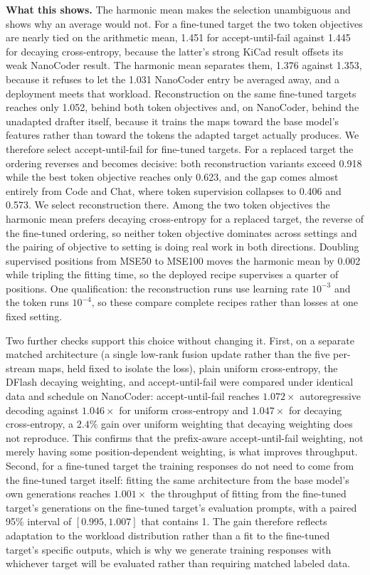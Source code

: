 \textbf{What this shows.} The harmonic mean makes the selection unambiguous and shows why an average would not. For a fine-tuned target the two token objectives are nearly tied on the arithmetic mean, 1.451 for accept-until-fail against 1.445 for decaying cross-entropy, because the latter's strong KiCad result offsets its weak NanoCoder result. The harmonic mean separates them, 1.376 against 1.353, because it refuses to let the 1.031 NanoCoder entry be averaged away, and a deployment meets that workload. Reconstruction on the same fine-tuned targets reaches only 1.052, behind both token objectives and, on NanoCoder, behind the unadapted drafter itself, because it trains the maps toward the base model's features rather than toward the tokens the adapted target actually produces. We therefore select accept-until-fail for fine-tuned targets. For a replaced target the ordering reverses and becomes decisive: both reconstruction variants exceed 0.918 while the best token objective reaches only 0.623, and the gap comes almost entirely from Code and Chat, where token supervision collapses to 0.406 and 0.573. We select reconstruction there. Among the two token objectives the harmonic mean prefers decaying cross-entropy for a replaced target, the reverse of the fine-tuned ordering, so neither token objective dominates across settings and the pairing of objective to setting is doing real work in both directions. Doubling supervised positions from MSE50 to MSE100 moves the harmonic mean by 0.002 while tripling the fitting time, so the deployed recipe supervises a quarter of positions. One qualification: the reconstruction runs use learning rate $10^{-3}$ and the token runs $10^{-4}$, so these compare complete recipes rather than losses at one fixed setting.

Two further checks support this choice without changing it. First, on a separate matched architecture (a single low-rank fusion update rather than the five per-stream maps, held fixed to isolate the loss), plain uniform cross-entropy, the DFlash decaying weighting, and accept-until-fail were compared under identical data and schedule on NanoCoder: accept-until-fail reaches $1.072\times$ autoregressive decoding against $1.046\times$ for uniform cross-entropy and $1.047\times$ for decaying cross-entropy, a $2.4\%$ gain over uniform weighting that decaying weighting does not reproduce. This confirms that the prefix-aware accept-until-fail weighting, not merely having some position-dependent weighting, is what improves throughput. Second, for a fine-tuned target the training responses do not need to come from the fine-tuned target itself: fitting the same architecture from the base model's own generations reaches $1.001\times$ the throughput of fitting from the fine-tuned target's generations on the fine-tuned target's evaluation prompts, with a paired 95\% interval of $[0.995, 1.007]$ that contains 1. The gain therefore reflects adaptation to the workload distribution rather than a fit to the fine-tuned target's specific outputs, which is why we generate training responses with whichever target will be evaluated rather than requiring matched labeled data.


